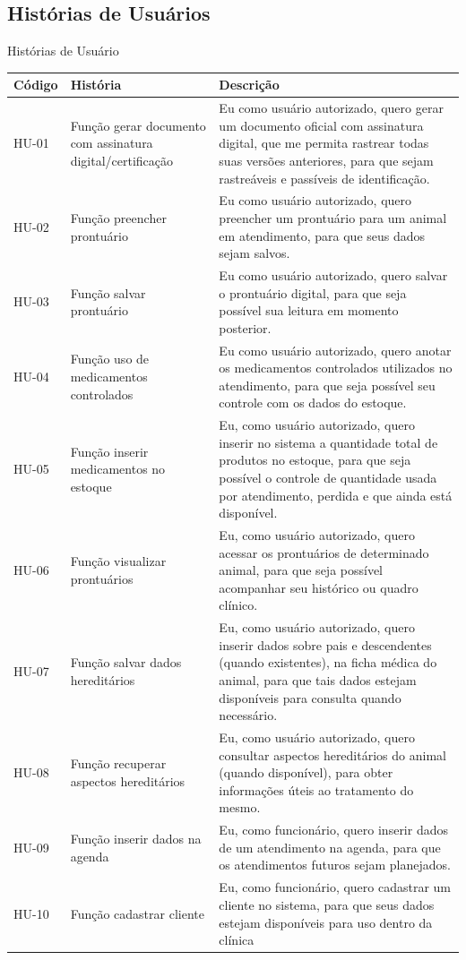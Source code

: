 \documentclass[
    12pt,               %
    openright,          %
    oneside,
    a4paper,            %
    BIBLATEX,           %
    TODO,               %
    english,            %
    brazil              %
    ]{ifsp-spo-inf-ctds}
\begin{document}
\subsection{Histórias de Usuários}

    
    \begin{center}
        \begin{quadro}[H]
        \caption{Histórias de Usuário}
        \begin{tabulary}{1.0\textwidth}{|p{5em}|p{8em}|p{18em}|}
        \hline
        Código & História & Descrição\\
        \hline
        HU-01 & Função gerar documento com assinatura digital/certificação & Eu como usuário autorizado, quero gerar um documento oficial com assinatura digital, que me permita rastrear todas suas versões anteriores, para que sejam rastreáveis e passíveis de identificação.\\
        \hline
        HU-02 & Função preencher prontuário & Eu como usuário autorizado, quero preencher um prontuário para um animal em atendimento, para que seus dados sejam salvos.\\
        \hline
        HU-03 & Função salvar prontuário & Eu como usuário autorizado, quero salvar o prontuário digital, para que seja possível sua leitura em momento posterior.\\
        \hline
        HU-04 & Função uso de medicamentos controlados & Eu como usuário autorizado, quero anotar os medicamentos controlados utilizados no atendimento, para que seja possível seu controle com os dados do estoque.\\
        \hline
        HU-05 & Função inserir medicamentos no estoque & Eu, como usuário autorizado, quero inserir no sistema a quantidade total de produtos no estoque, para que seja possível o controle de quantidade usada por atendimento, perdida e que ainda está disponível.\\
        \hline
        HU-06 & Função visualizar prontuários & Eu, como usuário autorizado, quero acessar os prontuários de determinado animal, para que seja possível acompanhar seu histórico ou quadro clínico.\\
        \hline
        HU-07 & Função salvar dados hereditários &  Eu, como usuário autorizado, quero inserir dados sobre pais e descendentes (quando existentes), na ficha médica do animal, para que tais dados estejam disponíveis para consulta quando necessário.\\
        \hline
        HU-08 &  Função recuperar aspectos hereditários &  Eu, como usuário autorizado, quero consultar aspectos hereditários do animal (quando disponível), para obter informações úteis ao tratamento do mesmo.\\
        \hline
        HU-09 & Função inserir dados na agenda & Eu, como funcionário, quero inserir dados de um atendimento na agenda, para que os atendimentos futuros sejam planejados.\\
        \hline
        HU-10 & Função cadastrar cliente & Eu, como funcionário, quero cadastrar um cliente no sistema, para que seus dados estejam disponíveis para uso dentro da clínica\\
        \hline
        \end{tabulary}


\end{quadro}
\end{center}
\end{document}
